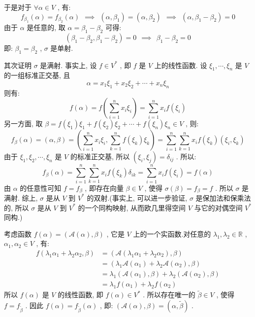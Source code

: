 \documentclass[11pt,a4paper,openany,oneside]{book}
\begin{document}
于是对于 $ \forall \alpha \in V $ , 有:
 $$  f_{\beta_1}(\alpha) = f_{\beta_2}(\alpha) \ \ \implies \ \ (\alpha, \beta_1) = (\alpha, \beta_2) \ \ \implies \ \ (\alpha, \beta_1-\beta_2) = 0  $$ 
由于 $ \alpha $ 是任意的, 取 $ \alpha=\beta_1-\beta_2 $ 可得:
 $$  (\beta_1-\beta_2, \beta_1-\beta_2)=0 \ \ \implies \ \ \beta_1 - \beta_2 = 0  $$ 
即: $ \beta_1 = \beta_2 $ ,  $ \sigma $ 是单射. 

其次证明 $ \sigma $ 是满射. 事实上, 设 $ f \in V^* $ , 即 $ f $ 是 $ V $ 上的线性函数. 设 $ \xi_1, \cdots, \xi_n $ 是 $ V $ 的一组标准正交基, 且
 $$  \alpha = x_1\xi_1 + x_2\xi_2 + \cdots + x_n\xi_n  $$ 
则有:
 $$  f(\alpha) = f(\sum\limits_{i=1}^n x_i\xi_i) = \sum\limits_{i=1}^n x_if(\xi_i)  $$ 
另一方面, 取 $ \beta = f(\xi_1)\xi_1 + f(\xi_2)\xi_2 + \cdots + f(\xi_n)\xi_n \in V $ , 则:
 $$  f_{\beta}(\alpha) = (\alpha, \beta) = (\sum\limits_{i=1}^nx_i\xi_i, \sum\limits_{k=1}^nf(\xi_k)\xi_k)=\sum\limits_{i=1}^n\sum\limits_{k=1}^n x_if(\xi_k)(\xi_i, \xi_k)  $$ 
由于 $ \xi_1, \xi_2, \cdots, \xi_n $ 是 $ V $ 的标准正交基, 所以 $ (\xi_i, \xi_j) = \delta_{ij} $ . 所以:
 $$  f_{\beta}(\alpha) = \sum\limits_{i=1}^n\sum\limits_{k=1}^n x_if(\xi_k)\delta_{ik} = \sum\limits_{i=1}^nx_if(\xi_i) = f(\alpha)  $$ 
由 $ \alpha $ 的任意性可知 $ f = f_{\beta} $ , 即存在向量 $ \beta \in V $ , 使得 $ \sigma(\beta) = f_{\beta}=f $ . 所以 $ \sigma $ 是满射.
综上,  $ \sigma $ 是从 $ V $ 到 $ V^* $ 的双射.(事实上, 可以进一步验证,  $ \sigma $ 是保加法和保乘法的, 所以 $ \sigma $ 是从 $ V $ 到 $ V^* $ 的一个同构映射, 从而欧几里得空间 $ V $ 与它的对偶空间 $ V^* $ 同构.)

考虑函数 $ f(\alpha) = (\mathcal{A}(\alpha), \beta) $ , 它是 $ V $ 上的一个实函数.对任意的 $ \lambda_1, \lambda_2 \in \mathbb{R} $ ,  $ \alpha_1, \alpha_2 \in V $ , 有:
\begin{align*}
f(\lambda_1\alpha_1+\lambda_2\alpha_2, \beta) &= (\mathcal{A}(\lambda_1\alpha_1 + \lambda_2\alpha_2), \beta) \\
&=(\lambda_1\mathcal{A}(\alpha_1) + \lambda_2\mathcal{A}(\alpha_2), \beta)  \\
&=\lambda_1(\mathcal{A}(\alpha_1), \beta) + \lambda_2(\mathcal{A}(\alpha_2), \beta) \\
&=\lambda_1f(\alpha_1) + \lambda_2f(\alpha_2)
\end{align*}
所以 $ f(\alpha) $ 是 $ V $ 的线性函数, 即 $ f(\alpha) \in V^* $ . 所以存在唯一的 $ \widetilde{\beta} \in V $ , 使得 $ f=f_{\widetilde{\beta}} $ . 因此 $ f(\alpha) = f_{\widetilde{\beta}}(\alpha) $ , 即: $ (\mathcal{A}(\alpha), \beta) = (\alpha, \widetilde{\beta}) $ . \\
\end{document}
